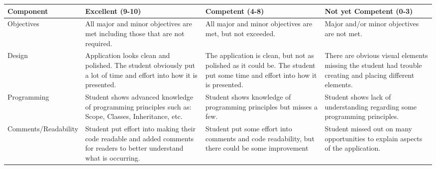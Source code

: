 \documentclass[12 pt]{article}
\begin{document}
\newpage
{}
\begin{landscape}
\centering 
	\begin{table}[h]
	\centering
		\begin{tabular}{|l|L|L|L|}
			\hline
			 Component &
			 Excellent (9-10) &
			 Competent (4-8) &
			 Not yet Competent (0-3)\\ 
			\hline

			Objectives &
			All major and minor objectives are met including those that are not required. &
			All major and minor objectives are met, but not exceeded. &
		    Major and/or minor objectives are not met.\\
			\hline
			Design &
			Application looks clean and polished. The student obviously put a lot of time and effort into how it is presented. &
			The application is clean, but not as polished as it could be. The student put some time and effort into how it is presented. &
			There are obvious visual elements missing the student had trouble creating and placing different elements. \\ 
			\hline
			Programming & 
			Student shows advanced knowledge of programming principles such as: Scope, Classes, Inheritance, etc. &
			Student shows knowledge of programming principles but misses a few. &
		 	Student shows lack of understanding regarding some programming principles. \\
			\hline
			Comments/Readability & 
			Student put effort into making their code readable and added comments for readers to better understand what is occurring. &
			Student put some effort into comments and code readability, but there could be some improvement &
			Student missed out on many opportunities to explain aspects of the application. \\
			\hline
		\end{tabular}
	\end{table}
\end{landscape}
\end{document}
